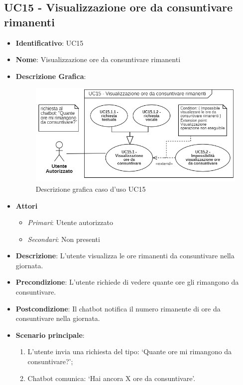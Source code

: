 \subsection{UC15 - Visualizzazione ore da consuntivare rimanenti }
\begin{itemize}
	\item \textbf{Identificativo}: UC15
	\item \textbf{Nome}: Visualizzazione ore da consuntivare rimanenti
	\item \textbf{Descrizione Grafica}:
	\begin{figure}[H]
		\centering\includegraphics[scale=0.65]{images/UC15.png}
		\caption{Descrizione grafica caso d'uso UC15}
	\end{figure}

	\item \textbf{Attori}
	\begin{itemize} 
		\item \textit{Primari}: Utente autorizzato
		\item \textit{Secondari}: Non presenti
	\end{itemize}
	\item \textbf{Descrizione}: L'utente visualizza le ore rimanenti da consuntivare nella giornata.
	\item \textbf{Precondizione}: L'utente richiede di vedere quante ore gli rimangono da consuntivare.
	\item \textbf{Postcondizione}: Il chatbot notifica il numero rimanente di ore da consuntivare nella giornata.
	\item \textbf{Scenario principale}: \begin{enumerate}
		\item L'utente invia una richiesta del tipo: `Quante ore mi rimangono da consuntivare?';
		\item Chatbot comunica: `Hai ancora X ore da consuntivare'.
	\end{enumerate}
\end{itemize}

